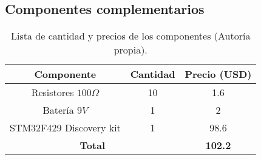 \subsection{Componentes complementarios}



\begin{table}[H]
\centering
\begin{tabular}{|cc|c|}
\hline
\multicolumn{1}{|c|}{\textbf{Componente}} & \textbf{Cantidad} & \textbf{Precio (USD)} \\ \hline
\multicolumn{1}{|c|}{Resistores $100\Omega$}        & 10                 & 1.6             \\ \hline
\multicolumn{1}{|c|}{Batería $9V$}        & 1                 & 2             \\ \hline
\multicolumn{1}{|c|}{STM32F429 Discovery kit}        & 1                 & 98.6              \\ \hline

\multicolumn{2}{|c|}{\textbf{Total}}                          & \textbf{102.2}    \\ \hline
\end{tabular}
\label{componentes}
\caption{Lista de cantidad y precios de los componentes (Autoría propia).}
\end{table}

